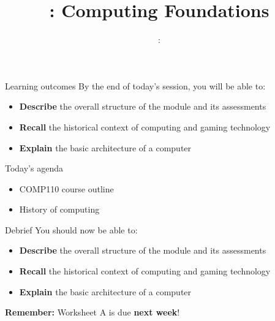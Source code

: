 \usepackage{../../beamerthemeFalmouthGamesAcademy}
\usepackage{multimedia}
\graphicspath{ {../../} }


\usepackage[normalem]{ulem}
\usepackage{wasysym}

\usepackage{pdfpages}

\usetikzlibrary{arrows,automata}




\hypersetup{
pdftex,
pdftitle=\sessionnumber: Computing Foundations,
pdfauthor=Ed Powley,
pdfdisplaydoctitle,
pdflang=en-GB
}
 

\title{\sessionnumber: Computing Foundations}
\subtitle{\modulecode: \moduletitle}

\frame{\titlepage} 

\begin{frame}{Learning outcomes}
	By the end of today's session, you will be able to:
	\begin{itemize}
		\item \textbf{Describe} the overall structure of the module and its assessments
		\item \textbf{Recall} the historical context of computing and gaming technology
		\item \textbf{Explain} the basic architecture of a computer
	\end{itemize}
\end{frame}

\begin{frame}{Today's agenda}
	\begin{itemize}
		\item COMP110 course outline
		\item History of computing
	\end{itemize}
\end{frame}





\begin{frame}{Debrief}
	\pause You should now be able to:
	\begin{itemize}
		\item \textbf{Describe} the overall structure of the module and its assessments
		\item \textbf{Recall} the historical context of computing and gaming technology
		\item \textbf{Explain} the basic architecture of a computer
	\end{itemize}
	\pause \textbf{Remember:} Worksheet A is due \textbf{next week}!
\end{frame}


